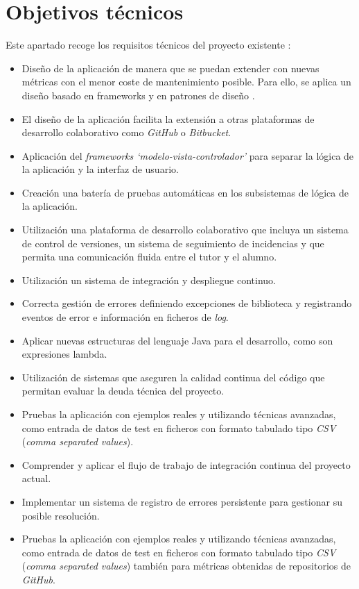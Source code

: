 \section{Objetivos técnicos}
Este apartado recoge los requisitos técnicos del proyecto existente \cite{TFGPrevio}:
\begin{itemize}
	\tightlist
	\item Diseño de la aplicación de manera que se puedan extender con nuevas métricas con el menor coste de mantenimiento posible. Para ello, se aplica un diseño basado en frameworks y en patrones de diseño \cite{gamma_patrones_2002}.
	\item El diseño de la aplicación facilita la extensión a otras plataformas de desarrollo colaborativo como \textit{GitHub} o \textit{Bitbucket}.
	\item Aplicación del \textit{frameworks `modelo-vista-controlador'} para separar la lógica de la aplicación y la interfaz de usuario.
	\item Creación una batería de pruebas automáticas en los subsistemas de lógica de la aplicación.
	\item Utilización una plataforma de desarrollo colaborativo que incluya un sistema de control de versiones, un sistema de seguimiento de incidencias y que permita una comunicación fluida entre el tutor y el alumno.
	\item Utilización un sistema de integración y despliegue continuo.
	\item Correcta gestión de errores definiendo excepciones de biblioteca y registrando eventos de error e información en ficheros de \textit{log}. 
	\item Aplicar nuevas estructuras  del lenguaje Java para el desarrollo, como son expresiones lambda. 
	\item Utilización de sistemas que aseguren la calidad continua del código que permitan evaluar la deuda técnica del proyecto.
	\item Pruebas la aplicación con ejemplos reales y utilizando técnicas avanzadas, como entrada de datos de test en ficheros con formato tabulado tipo \textit{CSV} (\textit{comma separated values}).
	\item Comprender y aplicar el flujo de trabajo de integración continua del proyecto actual.
	\item Implementar un sistema de registro de errores persistente para gestionar su posible resolución.
	\item Pruebas la aplicación con ejemplos reales y utilizando técnicas avanzadas, como entrada de datos de test en ficheros con formato tabulado tipo \textit{CSV} (\textit{comma separated values}) también para métricas obtenidas de repositorios de \textit{GitHub}. 		
\end{itemize}


